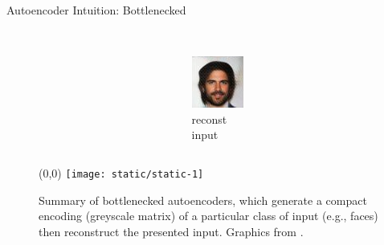 \begin{frame}{Autoencoder Intuition: Bottlenecked}
\begin{figure}
\begin{columns}
\begin{column}{0.5\textwidth}
  \end{column}
  \begin{column}{0.25\textwidth}
  \Large
  \centering
  ~\\[1.35ex]
  \phantom{input}
  \includegraphics[width=\textwidth]{img/curly-guy/latent-6}\\
  reconst \\ input
  \end{column}
  \end{columns}

  \vspace*{-9.35ex}

  \makebox(0,0){
    \texttt{[image: static/static-1]}\hspace{0.075ex}
  }

  \vspace*{9.35ex}


  \caption{
  Summary of bottlenecked autoencoders, which generate a compact encoding  (greyscale matrix) of a particular class of input (e.g., faces) then reconstruct the presented input.
  Graphics from \cite{white2016sampling}.
  }
\end{figure}

\end{frame}

